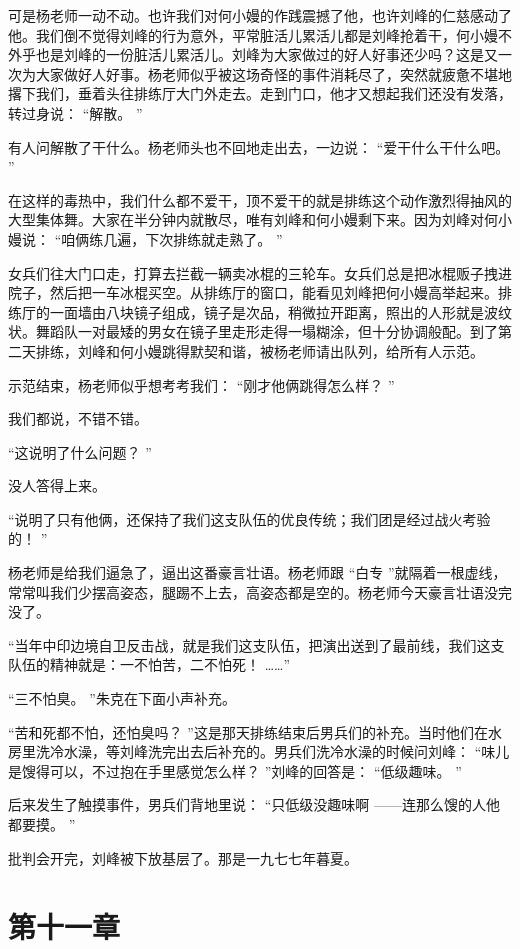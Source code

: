 \documentclass[12pt,twoside,openany]{book}
\begin{document}
可是杨老师一动不动。也许我们对何小嫚的作践震撼了他，也许刘峰的仁慈感动了他。我们倒不觉得刘峰的行为意外，平常脏活儿累活儿都是刘峰抢着干，何小嫚不外乎也是刘峰的一份脏活儿累活儿。刘峰为大家做过的好人好事还少吗？这是又一次为大家做好人好事。杨老师似乎被这场奇怪的事件消耗尽了，突然就疲惫不堪地撂下我们，垂着头往排练厅大门外走去。走到门口，他才又想起我们还没有发落，转过身说： “解散。 ”

有人问解散了干什么。杨老师头也不回地走出去，一边说： “爱干什么干什么吧。 ”

在这样的毒热中，我们什么都不爱干，顶不爱干的就是排练这个动作激烈得抽风的大型集体舞。大家在半分钟内就散尽，唯有刘峰和何小嫚剩下来。因为刘峰对何小嫚说： “咱俩练几遍，下次排练就走熟了。 ”

女兵们往大门口走，打算去拦截一辆卖冰棍的三轮车。女兵们总是把冰棍贩子拽进院子，然后把一车冰棍买空。从排练厅的窗口，能看见刘峰把何小嫚高举起来。排练厅的一面墙由八块镜子组成，镜子是次品，稍微拉开距离，照出的人形就是波纹状。舞蹈队一对最矮的男女在镜子里走形走得一塌糊涂，但十分协调般配。到了第二天排练，刘峰和何小嫚跳得默契和谐，被杨老师请出队列，给所有人示范。

示范结束，杨老师似乎想考考我们： “刚才他俩跳得怎么样？ ”

我们都说，不错不错。

“这说明了什么问题？ ”

没人答得上来。

“说明了只有他俩，还保持了我们这支队伍的优良传统；我们团是经过战火考验的！ ”

杨老师是给我们逼急了，逼出这番豪言壮语。杨老师跟 “白专 ”就隔着一根虚线，常常叫我们少摆高姿态，腿踢不上去，高姿态都是空的。杨老师今天豪言壮语没完没了。

“当年中印边境自卫反击战，就是我们这支队伍，把演出送到了最前线，我们这支队伍的精神就是：一不怕苦，二不怕死！ ……”

“三不怕臭。 ”朱克在下面小声补充。

“苦和死都不怕，还怕臭吗？ ”这是那天排练结束后男兵们的补充。当时他们在水房里洗冷水澡，等刘峰洗完出去后补充的。男兵们洗冷水澡的时候问刘峰： “味儿是馊得可以，不过抱在手里感觉怎么样？ ”刘峰的回答是： “低级趣味。 ”

后来发生了触摸事件，男兵们背地里说： “只低级没趣味啊 ——连那么馊的人他都要摸。 ”

批判会开完，刘峰被下放基层了。那是一九七七年暮夏。

\chapter{第十一章}
\end{document}
